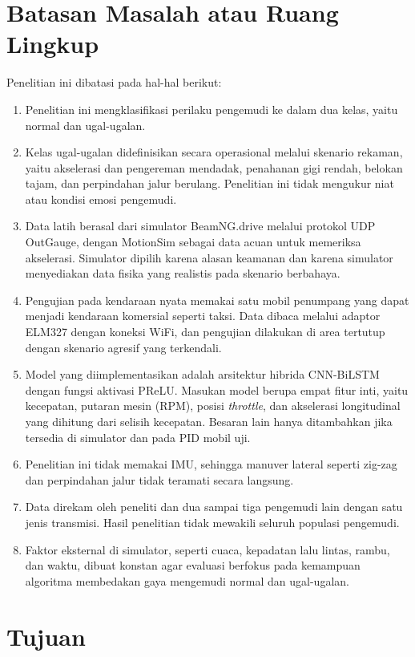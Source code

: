 \section{Batasan Masalah atau Ruang Lingkup}
Penelitian ini dibatasi pada hal-hal berikut:
\begin{enumerate}
    \item Penelitian ini mengklasifikasi perilaku pengemudi ke dalam dua kelas, yaitu normal dan ugal-ugalan.
    \item Kelas ugal-ugalan didefinisikan secara operasional melalui skenario rekaman, yaitu akselerasi dan pengereman mendadak, penahanan gigi rendah, belokan tajam, dan perpindahan jalur berulang. Penelitian ini tidak mengukur niat atau kondisi emosi pengemudi.
    \item Data latih berasal dari simulator BeamNG.drive melalui protokol UDP OutGauge, dengan MotionSim sebagai data acuan untuk memeriksa akselerasi. Simulator dipilih karena alasan keamanan dan karena simulator menyediakan data fisika yang realistis pada skenario berbahaya.
    \item Pengujian pada kendaraan nyata memakai satu mobil penumpang yang dapat menjadi kendaraan komersial seperti taksi. Data dibaca melalui adaptor ELM327 dengan koneksi WiFi, dan pengujian dilakukan di area tertutup dengan skenario agresif yang terkendali.
    \item Model yang diimplementasikan adalah arsitektur hibrida CNN-BiLSTM dengan fungsi aktivasi PReLU. Masukan model berupa empat fitur inti, yaitu kecepatan, putaran mesin (RPM), posisi \textit{throttle}, dan akselerasi longitudinal yang dihitung dari selisih kecepatan. Besaran lain hanya ditambahkan jika tersedia di simulator dan pada PID mobil uji.
    \item Penelitian ini tidak memakai IMU, sehingga manuver lateral seperti zig-zag dan perpindahan jalur tidak teramati secara langsung.
    \item Data direkam oleh peneliti dan dua sampai tiga pengemudi lain dengan satu jenis transmisi. Hasil penelitian tidak mewakili seluruh populasi pengemudi.
    \item Faktor eksternal di simulator, seperti cuaca, kepadatan lalu lintas, rambu, dan waktu, dibuat konstan agar evaluasi berfokus pada kemampuan algoritma membedakan gaya mengemudi normal dan ugal-ugalan.
\end{enumerate}

\section{Tujuan}

